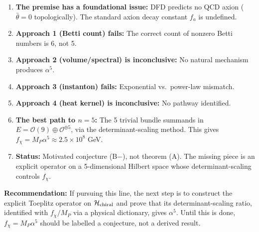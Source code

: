\documentclass[11pt]{article}
\theoremstyle{definition}
\theoremstyle{remark}
\begin{document}
\begin{enumerate}
\item \textbf{The premise has a foundational issue:} DFD predicts no QCD axion
  ($\bar\theta = 0$ topologically). The standard axion decay constant $f_a$
  is undefined.

\item \textbf{Approach 1 (Betti count) fails:} The correct count of nonzero
  Betti numbers is 6, not 5.

\item \textbf{Approach 2 (volume/spectral) is inconclusive:} No natural
  mechanism produces $\alpha^5$.

\item \textbf{Approach 3 (instanton) fails:} Exponential vs.\ power-law
  mismatch.

\item \textbf{Approach 4 (heat kernel) is inconclusive:} No pathway identified.

\item \textbf{The best path to $n = 5$:} The 5 trivial bundle summands in
  $E = \mathcal{O}(9) \oplus \mathcal{O}^{\oplus 5}$, via the
  determinant-scaling method. This gives $f_\chi = M_P\alpha^5 \approx 2.5 \times 10^8$ GeV.

\item \textbf{Status:} Motivated conjecture (B$-$), not theorem (A). The
  missing piece is an explicit operator on a 5-dimensional Hilbert space
  whose determinant-scaling controls $f_\chi$.
\end{enumerate}

\vspace{1em}
\noindent\textbf{Recommendation:} If pursuing this line, the next step is to
construct the explicit Toeplitz operator on $\mathcal{H}_{\rm chiral}$ and
prove that its determinant-scaling ratio, identified with $f_\chi/M_P$ via
a physical dictionary, gives $\alpha^5$. Until this is done, $f_\chi = M_P\alpha^5$
should be labelled a conjecture, not a derived result.
\end{document}

